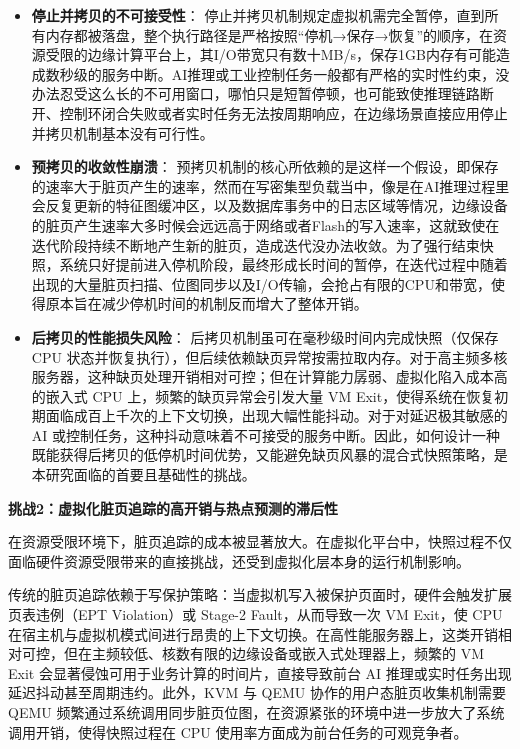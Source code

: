 \begin{itemize}

\item \textbf{停止并拷贝的不可接受性}：
停止并拷贝机制规定虚拟机需完全暂停，直到所有内存都被落盘，整个执行路径是严格按照“停机→保存→恢复”的顺序，在资源受限的边缘计算平台上，其I/O带宽只有数十MB/s，保存1GB内存有可能造成数秒级的服务中断。AI推理或工业控制任务一般都有严格的实时性约束，没办法忍受这么长的不可用窗口，哪怕只是短暂停顿，也可能致使推理链路断开、控制环闭合失败或者实时任务无法按周期响应，在边缘场景直接应用停止并拷贝机制基本没有可行性。

\item \textbf{预拷贝的收敛性崩溃}：
预拷贝机制的核心所依赖的是这样一个假设，即保存的速率大于脏页产生的速率，然而在写密集型负载当中，像是在AI推理过程里会反复更新的特征图缓冲区，以及数据库事务中的日志区域等情况，边缘设备的脏页产生速率大多时候会远远高于网络或者Flash的写入速率，这就致使在迭代阶段持续不断地产生新的脏页，造成迭代没办法收敛。为了强行结束快照，系统只好提前进入停机阶段，最终形成长时间的暂停，在迭代过程中随着出现的大量脏页扫描、位图同步以及I/O传输，会抢占有限的CPU和带宽，使得原本旨在减少停机时间的机制反而增大了整体开销。

\item \textbf{后拷贝的性能损失风险}：
后拷贝机制虽可在毫秒级时间内完成快照（仅保存 CPU 状态并恢复执行），但后续依赖缺页异常按需拉取内存。对于高主频多核服务器，这种缺页处理开销相对可控；但在计算能力孱弱、虚拟化陷入成本高的嵌入式 CPU 上，频繁的缺页异常会引发大量 VM Exit，使得系统在恢复初期面临成百上千次的上下文切换，出现大幅性能抖动。对于对延迟极其敏感的 AI 或控制任务，这种抖动意味着不可接受的服务中断。因此，如何设计一种既能获得后拷贝的低停机时间优势，又能避免缺页风暴的混合式快照策略，是本研究面临的首要且基础性的挑战。


\end{itemize}

\textbf{挑战2：虚拟化脏页追踪的高开销与热点预测的滞后性}

在资源受限环境下，脏页追踪的成本被显著放大。在虚拟化平台中，快照过程不仅面临硬件资源受限带来的直接挑战，还受到虚拟化层本身的运行机制影响。

传统的脏页追踪依赖于写保护策略：当虚拟机写入被保护页面时，硬件会触发扩展页表违例（EPT Violation）或 Stage-2 Fault，从而导致一次 VM Exit，使 CPU 在宿主机与虚拟机模式间进行昂贵的上下文切换。在高性能服务器上，这类开销相对可控，但在主频较低、核数有限的边缘设备或嵌入式处理器上，频繁的 VM Exit 会显著侵蚀可用于业务计算的时间片，直接导致前台 AI 推理或实时任务出现延迟抖动甚至周期违约\cite{wang2014vm}。此外，KVM 与 QEMU 协作的用户态脏页收集机制需要 QEMU 频繁通过系统调用同步脏页位图，在资源紧张的环境中进一步放大了系统调用开销，使得快照过程在 CPU 使用率方面成为前台任务的可观竞争者。

